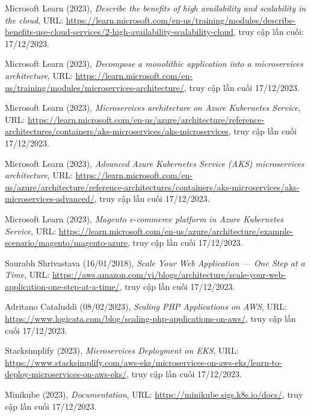 \begin{thebibliography}{1}
Microsoft Learn (2023), \emph{Describe the benefits of high availability and scalability in the cloud}, URL: \url{https://learn.microsoft.com/en-us/training/modules/describe-benefits-use-cloud-services/2-high-availability-scalability-cloud}, truy cập lần cuối: 17/12/2023.

Microsoft Learn (2023), \emph{Decompose a monolithic application into a microservices architecture}, URL: \url{https://learn.microsoft.com/en-us/training/modules/microservices-architecture/}, truy cập lần cuối 17/12/2023.

Microsoft Learn (2023), \emph{Microservices architecture on Azure Kubernetes Service}, URL: \url{https://learn.microsoft.com/en-us/azure/architecture/reference-architectures/containers/aks-microservices/aks-microservices}, truy cập lần cuối 17/12/2023.


Microsoft Learn (2023), \emph{Advanced Azure Kubernetes Service (AKS) microservices architecture}, URL: \url{https://learn.microsoft.com/en-us/azure/architecture/reference-architectures/containers/aks-microservices/aks-microservices-advanced/}, truy cập lần cuối 17/12/2023.

Microsoft Learn (2023), \emph{Magento e-commerce platform in Azure Kubernetes Service}, URL: \url{https://learn.microsoft.com/en-us/azure/architecture/example-scenario/magento/magento-azure}, truy cập lần cuối 17/12/2023.

Saurabh Shrivastava (16/01/2018), \emph{Scale Your Web Application — One Step at a Time}, URL: \url{https://aws.amazon.com/vi/blogs/architecture/scale-your-web-application-one-step-at-a-time/}, truy cập lần cuối 17/12/2023.

Adritano Cataluddi (08/02/2023), \emph{Scaling PHP Applications on AWS}, URL: \url{https://www.logicata.com/blog/scaling-php-applications-on-aws/}, truy cập lần cuối 17/12/2023.

Stacksimplify (2023), \emph{Microservices Deployment on EKS}, URL: \url{https://www.stacksimplify.com/aws-eks/microservices-on-aws-eks/learn-to-deploy-microservices-on-aws-eks/}, truy cập lần cuối 17/12/2023.

Minikube (2023), \emph{Documentation}, URL: \url{https://minikube.sigs.k8s.io/docs/}, truy cập lần cuối 17/12/2023.


\end{thebibliography}